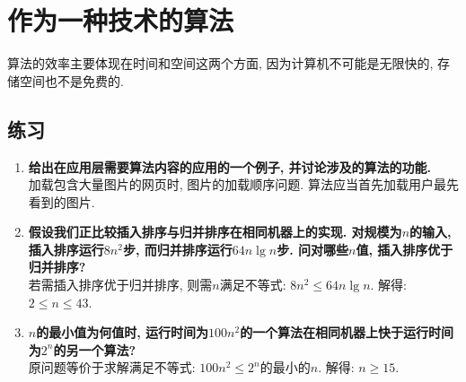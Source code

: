 \documentclass[UTF8,a4paper,zihao=-4,oneside,onecolumn,scheme=chinese,autoindent=true]{ctexbook}
\begin{document}
\section{作为一种技术的算法}
算法的效率主要体现在时间和空间这两个方面, 因为计算机不可能是无限快的, 存储空间也不是免费的.

\subsection*{练习}
\begin{enumerate}
    \renewcommand{\labelenumi}{\thesection-\theenumi}
    \item {\textbf{给出在应用层需要算法内容的应用的一个例子, 并讨论涉及的算法的功能. }\\加载包含大量图片的网页时, 图片的加载顺序问题. 算法应当首先加载用户最先看到的图片. }
    \item {\textbf{假设我们正比较插入排序与归并排序在相同机器上的实现. 对规模为$n$的输入, 插入排序运行$8n^2$步, 而归并排序运行$64n\lg{n}$步. 问对哪些$n$值, 插入排序优于归并排序? }\\若需插入排序优于归并排序, 则需$n$满足不等式: $8n^2 \le 64n\lg{n}$. 解得: $2 \leq n \leq 43$. }
    \item {\textbf{$n$的最小值为何值时, 运行时间为$100n^2$的一个算法在相同机器上快于运行时间为$2^n$的另一个算法? }\\原问题等价于求解满足不等式: $100n^2 \le 2^n$的最小的$n$. 解得: $n \geq 15$. }
\end{enumerate}

\end{document}
